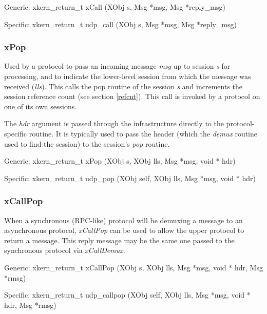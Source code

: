 {\sanss Generic:} {\sem xkern\_return\_t} {\bold xCall} ({\sem XObj} {\caps s}, {\sem Msg} *{\caps msg}, {\sem Msg} *{\caps reply\_msg})
\medskip

{\sanss Specific:} {\sem xkern\_return\_t} {\bold udp\_call} ({\sem XObj} {\caps s}, {\sem Msg} *{\caps msg}, {\sem Msg} *{\caps reply\_msg})

\subsubsection{xPop}\label{xPop}

\noindent Used by a protocol to pass an incoming message {\em msg} up to 
session {\em s} for processing, and to indicate the lower-level
session from which the message was received ({\em lls}).  This calls
the pop routine of the session {\em s} and increments the session
reference count (see section \ref{refcnt}).  This call is invoked by a
protocol on one of its own sessions.

The {\em hdr} argument is passed through the infrastructure directly
to the protocol-specific routine.  It is typically used to pass the
header (which the {\em demux} routine used to find the session)
to the session's {\em pop} routine.

\medskip

{\sanss Generic:} {\sem xkern\_return\_t} {\bold xPop} 
({\sem XObj} {\caps s}, {\sem XObj} {\caps lls}, {\sem Msg} *{\caps msg},
 {\sem void *} {\caps hdr})
\medskip

{\sanss Specific: }{\sem xkern\_return\_t} {\bold udp\_pop} 
({\sem XObj} {\caps self}, {\sem XObj} {\caps lls}, {\sem Msg} *{\caps msg},
 {\sem void *} {\caps hdr})


\subsubsection{xCallPop}

When a  synchronous (RPC-like) protocol will  be demuxing a message to
an asynchronous  protocol, {\em xCallPop}  can  be  used  to allow the
upper protocol to return a message. This reply message may be the same
one passed to the synchronous protocol via {\em xCallDemux}.
\medskip

{\sanss Generic:} {\sem xkern\_return\_t} {\bold xCallPop} 
({\sem XObj} {\caps s}, {\sem XObj} {\caps lls}, 
{\sem Msg} *{\caps msg},  {\sem void *} {\caps hdr},
{\sem Msg} *{\caps rmsg})
\medskip

{\sanss Specific:} {\sem xkern\_return\_t} {\bold udp\_callpop} 
({\sem XObj} {\caps self}, {\sem XObj} {\caps lls}, 
{\sem Msg} *{\caps msg},  {\sem void *} {\caps hdr},
{\sem Msg} *{\caps rmsg})

